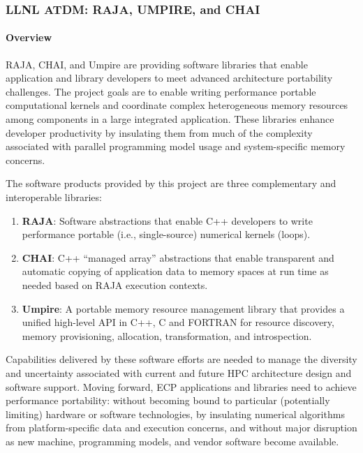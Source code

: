 \subsubsection{ LLNL ATDM: RAJA, UMPIRE, and CHAI}


\paragraph{Overview}

RAJA, CHAI, and Umpire are providing software libraries that enable
application and library developers to meet advanced architecture
portability challenges. The project goals are to enable writing
performance portable computational kernels and coordinate complex
heterogeneous memory resources among components in a large integrated
application. These libraries enhance developer productivity by insulating
them from much of the complexity associated with parallel programming
model usage and system-specific memory concerns.

The software products provided by this project are three complementary
and interoperable libraries:

\begin{enumerate}

\item {\bf RAJA}: Software abstractions that enable C++ developers to write
    performance portable (i.e., single-source) numerical kernels (loops).

\item {\bf CHAI}: C++ ``managed array'' abstractions that enable transparent
    and automatic copying of application data to memory spaces at run
    time as needed based on RAJA execution contexts.

\item {\bf Umpire}: A portable memory resource management library that provides
    a unified high-level API in C++, C and FORTRAN for resource
    discovery, memory provisioning, allocation, transformation, and
    introspection.

\end{enumerate}

Capabilities delivered by these software efforts are needed to manage the
diversity and uncertainty associated with current and future HPC
architecture design and software support. Moving forward, ECP
applications and libraries need to achieve performance portability:
without becoming bound to particular (potentially limiting) hardware or
software technologies, by insulating numerical algorithms from
platform-specific data and execution concerns, and without major
disruption as new machine, programming models, and vendor software become
available.

